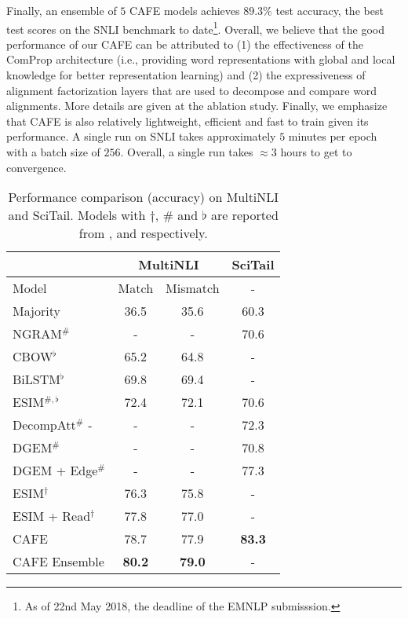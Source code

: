 \documentclass[11pt,a4paper]{article}
\begin{document}
Finally, an ensemble of $5$ CAFE models achieves $89.3\%$ test accuracy, the best test scores on the SNLI benchmark to date\footnote{As of 22nd May 2018, the deadline of the EMNLP submisssion.}. Overall, we believe that the good performance of our CAFE can be attributed to (1) the effectiveness of the ComProp architecture (i.e., providing word representations with global and local knowledge for better representation learning) and (2) the expressiveness of alignment factorization layers that are used to decompose and compare word alignments. More details are given at the ablation study. Finally, we emphasize that CAFE is also relatively lightweight, efficient and fast to train given its performance. A single run on SNLI takes approximately $5$ minutes per epoch with a batch size of $256$. Overall, a single run takes $\approx 3$ hours to get to convergence.


\begin{table}[htbp]
  \centering
\small
    \begin{tabular}{|l|cc|c|}
    \hline
    & \multicolumn{2}{c}{MultiNLI} & SciTail \\
    \hline
    Model & \multicolumn{1}{l}{Match} & \multicolumn{1}{|l|}{Mismatch} & - \\
    \hline
    Majority & 36.5 & 35.6 & 60.3 \\
    NGRAM$^\#$ & - & - & 70.6 \\
CBOW$^{\flat}$ & 65.2 & 64.8 & - \\
    BiLSTM$^{\flat}$  & 69.8 & 69.4 & -\\
    \hline
     ESIM$^{\#,\flat}$ & 72.4  & 72.1 & 70.6 \\
    DecompAtt$^\#$ - & - & - &72.3\\
    DGEM$^\#$ & - & - &70.8 \\
    DGEM + Edge$^\#$ & -  & - &77.3 \\
   \hline
    ESIM$^\dagger$  & 76.3  & 75.8 & -\\
    ESIM + Read$^\dagger$  & 77.8 & 77.0 & - \\
    \hline
    \textsc{CAFE} & 78.7  & 77.9 & \textbf{83.3} \\
    CAFE Ensemble & \textbf{80.2}& \textbf{79.0} & - \\
    \hline
    \end{tabular}\caption{Performance comparison (accuracy) on MultiNLI and SciTail. Models with $\dagger$, $\#$ and $\flat$ are reported from \cite{DBLP:journals/corr/Weissenborn17}, \cite{scitail} and \cite{DBLP:journals/corr/WilliamsNB17} respectively.}\label{multinli_results}
\end{table}
\end{document}
